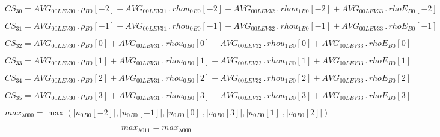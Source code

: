 \documentclass{article}
\begin{document}
\begin{dmath}CS_{30} = AVG_{0 0 LEV 30} \,.\, {\rho{_{B0}}}[{-2}] + AVG_{0 0 LEV 31} \,.\, {rhou_{0}{_{B0}}}[{-2}] + AVG_{0 0 LEV 32} \,.\, {rhou_{1}{_{B0}}}[{-2}] + AVG_{0 0 LEV 33} \,.\, {rhoE{_{B0}}}[{-2}]\end{dmath}

\begin{dmath}CS_{31} = AVG_{0 0 LEV 30} \,.\, {\rho{_{B0}}}[{-1}] + AVG_{0 0 LEV 31} \,.\, {rhou_{0}{_{B0}}}[{-1}] + AVG_{0 0 LEV 32} \,.\, {rhou_{1}{_{B0}}}[{-1}] + AVG_{0 0 LEV 33} \,.\, {rhoE{_{B0}}}[{-1}]\end{dmath}

\begin{dmath}CS_{32} = AVG_{0 0 LEV 30} \,.\, {\rho{_{B0}}}[{0}] + AVG_{0 0 LEV 31} \,.\, {rhou_{0}{_{B0}}}[{0}] + AVG_{0 0 LEV 32} \,.\, {rhou_{1}{_{B0}}}[{0}] + AVG_{0 0 LEV 33} \,.\, {rhoE{_{B0}}}[{0}]\end{dmath}

\begin{dmath}CS_{33} = AVG_{0 0 LEV 30} \,.\, {\rho{_{B0}}}[{1}] + AVG_{0 0 LEV 31} \,.\, {rhou_{0}{_{B0}}}[{1}] + AVG_{0 0 LEV 32} \,.\, {rhou_{1}{_{B0}}}[{1}] + AVG_{0 0 LEV 33} \,.\, {rhoE{_{B0}}}[{1}]\end{dmath}

\begin{dmath}CS_{34} = AVG_{0 0 LEV 30} \,.\, {\rho{_{B0}}}[{2}] + AVG_{0 0 LEV 31} \,.\, {rhou_{0}{_{B0}}}[{2}] + AVG_{0 0 LEV 32} \,.\, {rhou_{1}{_{B0}}}[{2}] + AVG_{0 0 LEV 33} \,.\, {rhoE{_{B0}}}[{2}]\end{dmath}

\begin{dmath}CS_{35} = AVG_{0 0 LEV 30} \,.\, {\rho{_{B0}}}[{3}] + AVG_{0 0 LEV 31} \,.\, {rhou_{0}{_{B0}}}[{3}] + AVG_{0 0 LEV 32} \,.\, {rhou_{1}{_{B0}}}[{3}] + AVG_{0 0 LEV 33} \,.\, {rhoE{_{B0}}}[{3}]\end{dmath}

\begin{dmath}max_{\lambda 0 00} = \max\left(\left|{{u_{0}{_{B0}}}[{-2}]}\right|, \left|{{u_{0}{_{B0}}}[{-1}]}\right|, \left|{{u_{0}{_{B0}}}[{0}]}\right|, \left|{{u_{0}{_{B0}}}[{3}]}\right|, \left|{{u_{0}{_{B0}}}[{1}]}\right|, 
\left|{{u_{0}{_{B0}}}[{2}]}\right|\right)\end{dmath}

\begin{dmath}max_{\lambda 0 11} = max_{\lambda 0 00}\end{dmath}
\end{document}
